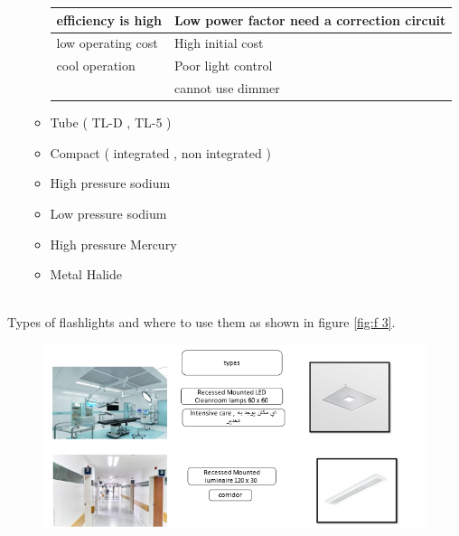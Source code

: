 \documentclass[12pt,fleqn]{book} %
\begin{document}
\begin{enumerate}
\begin{itemize}
\begin{table}[!h]
\begin{tabular}{!{\color[rgb]{0.584,0.702,0.843}\vrule}l!{\color{black}\vrule}l!{\color[rgb]{0.584,0.702,0.843}\vrule}}
\hline
efficiency is high                                                                                                                                                   & Low power factor  need a correction circuit                                                                                                                  \\ 
\hline
{} low operating cost                                                                                                                 & High initial cost                                                                                                                                            \\ 
\hline
cool operation                                                                                                                                                       & Poor light control                                                                                                                                           \\ 
\hline
{} ~                                                                                                                                  & cannot use dimmer                                                                                                                                            \\
\hline
\end{tabular}
\end{table}
        \item Tube ( TL-D , TL-5 )
        \item Compact ( integrated , non integrated )
        \item High pressure sodium
        \item Low pressure sodium
        \item High pressure Mercury
        \item Metal Halide
    \end{itemize}
    \end{enumerate}
    \newpage
\\ Types of flashlights and where to use them as shown in figure \ref{fig:f 3}.
\begin{figure}[!h]
    \centering
    \includegraphics[width=1\linewidth]{f 1.png}
   
    \label{fig:f 1}
\end{figure}
\end{document}
